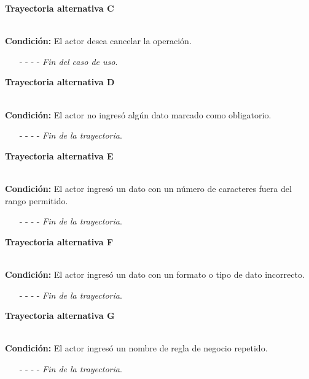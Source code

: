 \hypertarget{CU8-2:TAC}{\textbf{Trayectoria alternativa C}}\\
\noindent \textbf{Condición:} El actor desea cancelar la operación.
\begin{enumerate}
	\UCpaso[\UCactor] Solicita cancelar la operación oprimiendo el botón  de la pantalla 
	\UCpaso[\UCsist] Muestra la pantalla .
	\item[- -] - - {\em {Fin del caso de uso}}.%
\end{enumerate}
\hypertarget{CU8-2:TAD}{\textbf{Trayectoria alternativa D}}\\
\noindent \textbf{Condición:} El actor no ingresó algún dato marcado como obligatorio.
\begin{enumerate}
	\UCpaso[\UCsist] Muestra el mensaje  señalando el campo que presenta el error en la pantalla .
	\UCpaso Regresa al paso \ref{CU8.2-P5} de la trayectoria principal.
	\item[- -] - - {\em {Fin de la trayectoria}}.%
\end{enumerate}
\hypertarget{CU8-2:TAE}{\textbf{Trayectoria alternativa E}}\\
\noindent \textbf{Condición:} El actor ingresó un dato con un número de caracteres fuera del rango permitido.
\begin{enumerate}
	\UCpaso[\UCsist] Muestra el mensaje  señalando el campo que presenta el error en la pantalla .
	\UCpaso Regresa al paso \ref{CU8.2-P5} de la trayectoria principal.
	\item[- -] - - {\em {Fin de la trayectoria}}.%
\end{enumerate}
\hypertarget{CU8-2:TAF}{\textbf{Trayectoria alternativa F}}\\
\noindent \textbf{Condición:} El actor ingresó un dato con un formato o tipo de dato incorrecto.
\begin{enumerate}
	\UCpaso[\UCsist] Muestra el mensaje  señalando el campo que presenta el error en la pantalla .
	\UCpaso Regresa al paso \ref{CU8.2-P5} de la trayectoria principal.
	\item[- -] - - {\em {Fin de la trayectoria}}.
\end{enumerate}
\hypertarget{CU8-2:TAG}{\textbf{Trayectoria alternativa G}}\\
\noindent \textbf{Condición:} El actor ingresó un nombre de regla de negocio repetido.
\begin{enumerate}
	\UCpaso[\UCsist] Muestra el mensaje  señalando el campo que presenta la duplicidad en la pantalla .
	\UCpaso Regresa al paso \ref{CU8.2-P5} de la trayectoria principal.
	\item[- -] - - {\em {Fin de la trayectoria}}.
\end{enumerate}
